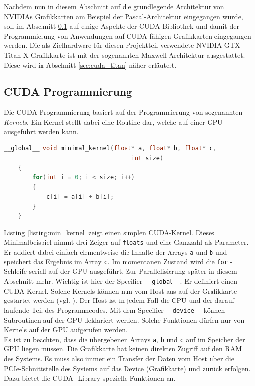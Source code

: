 \documentclass[../main.tex]{subfiles}
\begin{document}
Nachdem nun in diesem Abschnitt auf die grundlegende Architektur von NVIDIAs Grafikkarten am Beispiel der Pascal-Architektur eingegangen wurde, soll im Abschnitt \ref{sec:cuda_programmierung} auf einige Aspekte der CUDA-Bibliothek und damit der Programmierung von Anwendungen auf CUDA-fähigen Grafikkarten eingegangen werden. Die als Zielhardware für diesen Projektteil verwendete NVIDIA GTX Titan X Grafikkarte ist mit der sogenannten Maxwell Architektur ausgestattet. Diese wird in Abschnitt \ref{sec:cuda_titan} näher erläutert. \par 
\subsection{CUDA Programmierung} \label{sec:cuda_programmierung}
Die CUDA-Programmierung basiert auf der Programmierung von sogenannten \emph{Kernels}. Ein Kernel stellt dabei eine Routine dar, welche auf einer GPU ausgeführt werden kann. \par 
\begin{lstlisting}[language=C, caption=Minimaler Kernel, captionpos=b, label=listing:min_kernel]
	__global__ void minimal_kernel(float* a, float* b, float* c, 
									int size)
	{
		for(int i = 0; i < size; i++)
		{
			c[i] = a[i] + b[i];
		}		
	}
\end{lstlisting}
Listing \ref{listing:min_kernel} zeigt einen simplen CUDA-Kernel. Dieses Minimalbeispiel nimmt drei Zeiger auf \texttt{floats} und eine Ganzzahl als Parameter. Er addiert dabei einfach elementweise die Inhalte der Arrays \texttt{a} und \texttt{b} und speichert das Ergebnis im Array \texttt{c}. Im momentanen Zustand wird die \texttt{for} -Schleife seriell auf der GPU ausgeführt. Zur Parallelisierung später in diesem Abschnitt mehr. Wichtig ist hier der Specifier \texttt{\_\_global\_\_}. Er definiert einen CUDA-Kernel. Solche Kernels können nun vom Host aus auf der Grafikkarte gestartet werden (vgl. \cite{CUDA_GUIDE}). Der Host ist in jedem Fall die CPU und der darauf laufende Teil des Programmcodes. Mit dem Specifier \texttt{\_\_device\_\_} können Subroutinen auf der GPU deklariert werden. Solche Funktionen dürfen nur von Kernels auf der GPU aufgerufen werden. \\ Es ist zu beachten, dass die übergebenen Arrays \texttt{a}, \texttt{b} und \texttt{c} auf im Speicher der GPU liegen müssen. Die Grafikkarte hat keinen direkten Zugriff auf den RAM des Systems. Es muss also immer ein Transfer der Daten vom Host über die PCIe-Schnittstelle des Systems auf das Device (Grafikkarte) und zurück erfolgen. Dazu bietet die CUDA- Library spezielle Funktionen an. \par 
\end{document}
